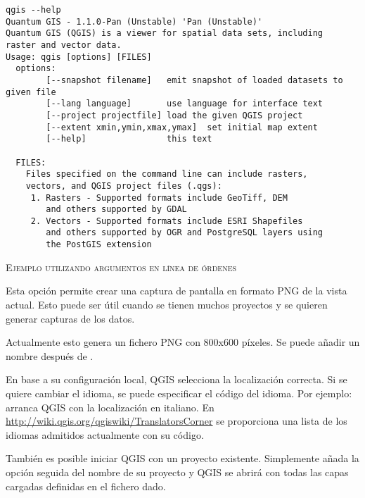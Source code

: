 \small
\begin{verbatim}
qgis --help
Quantum GIS - 1.1.0-Pan (Unstable) 'Pan (Unstable)'
Quantum GIS (QGIS) is a viewer for spatial data sets, including
raster and vector data.
Usage: qgis [options] [FILES]
  options:
        [--snapshot filename]   emit snapshot of loaded datasets to given file
        [--lang language]       use language for interface text
        [--project projectfile] load the given QGIS project
        [--extent xmin,ymin,xmax,ymax]  set initial map extent
        [--help]                this text

  FILES:
    Files specified on the command line can include rasters,
    vectors, and QGIS project files (.qgs):
     1. Rasters - Supported formats include GeoTiff, DEM
        and others supported by GDAL
     2. Vectors - Supported formats include ESRI Shapefiles
        and others supported by OGR and PostgreSQL layers using
        the PostGIS extension
\end{verbatim}
\normalsize

\begin{Tip} \caption{\textsc{Ejemplo utilizando argumentos en línea de órdenes}}
\end{Tip}

Esta opción permite crear una captura de pantalla en formato PNG de la vista actual.
Esto puede ser útil cuando se tienen muchos proyectos y se quieren generar capturas de los datos.

Actualmente esto genera un fichero PNG con 800x600 píxeles. Se puede añadir un nombre después de
.

En base a su configuración local, QGIS selecciona la localización correcta. Si se quiere 
cambiar el idioma, se puede especificar el código del idioma. Por ejemplo:
arranca QGIS con la localización en italiano. En \url{http://wiki.qgis.org/qgiswiki/TranslatorsCorner}
se proporciona una lista de los idiomas admitidos actualmente con su código.

También es posible iniciar QGIS con un proyecto existente. Simplemente añada 
la opción  seguida del nombre de su proyecto y QGIS se abrirá 
con todas las capas cargadas definidas en el fichero dado.

